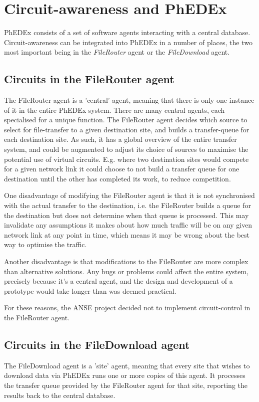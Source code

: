 \section{Circuit-awareness and PhEDEx}

PhEDEx consists of a set of software agents interacting with a central database. Circuit-awareness can be integrated into PhEDEx in a number of places, the two most important being in the {\it FileRouter} agent or the {\it FileDownload} agent.

\subsection{Circuits in the FileRouter agent}
The FileRouter agent is a 'central' agent, meaning that there is only one instance of it in the entire PhEDEx system. There are many central agents, each specialised for a unique function. The FileRouter agent decides which source to select for file-transfer to a given destination site, and builds a transfer-queue for each destination site. As such, it has a global overview of the entire transfer system, and could be augmented to adjust its choice of sources to maximise the potential use of virtual circuits. E.g. where two destination sites would compete for a given network link it could choose to not build a transfer queue for one destination until the other has completed its work, to reduce competition.

One disadvantage of modifying the FileRouter agent is that it is not synchronised with the actual transfer to the destination, i.e. the FileRouter builds a queue for the destination but does not determine when that queue is processed. This may invalidate any assumptions it makes about how much traffic will be on any given network link at any point in time, which means it may be wrong about the best way to optimise the traffic.

Another disadvantage is that modifications to the FileRouter are more complex than alternative solutions. Any bugs or problems could affect the entire system, precisely because it's a central agent, and the design and development of a prototype would take longer than was deemed practical.

For these reasons, the ANSE project decided not to implement circuit-control in the FileRouter agent.

\subsection{Circuits in the FileDownload agent}
The FileDownload agent is a 'site' agent, meaning that every site that wishes to download data via PhEDEx runs one or more copies of this agent. It processes the transfer queue provided by the FileRouter agent for that site, reporting the results back to the central database.

